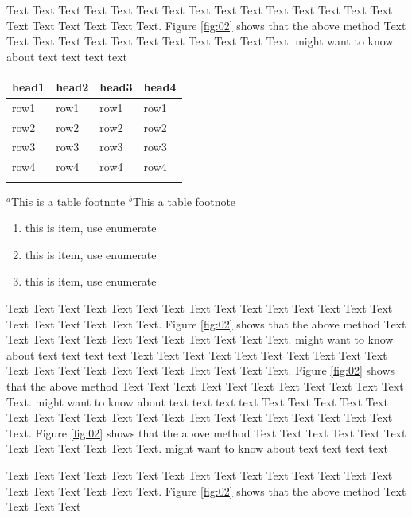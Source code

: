\documentclass{Rpd}
\begin{document}
Text Text Text Text Text Text  Text Text Text Text Text Text Text Text Text  Text Text Text Text Text Text. Figure \ref{fig:02} shows that the above method  Text Text Text Text  Text Text Text Text Text Text  Text Text.  \cite{Boffelli03} might want to know about  text text text text


\begin{table}[t]
{\begin{tabular}{llll}\toprule
head1 & head2 & head3 & head4\\\midrule
row1 & row1 & row1 & row1\\
row2 & row2 & row2 & row2\\
row3 & row3 & row3 & row3\\
row4 & row4 & row4 & row4\\\botrule
\end{tabular}}{$^a$This is a table footnote\newline
$^b$This a table footnote}
\end{table}

\begin{enumerate}[2.]%
\item this is item, use enumerate 
\item this is item, use enumerate 
\item this is item, use enumerate 
\end{enumerate}

Text Text Text Text Text Text  Text Text Text Text Text Text Text Text Text  Text Text Text Text Text Text. Figure \ref{fig:02} shows that the above method  Text Text Text Text  Text Text Text Text Text Text  Text Text.  \cite{Boffelli03} might want to know about  text text text text
Text Text Text Text Text Text  Text Text Text Text Text Text Text Text Text  Text Text Text Text Text Text. Figure \ref{fig:02} shows that the above method  Text Text Text Text  Text Text Text Text Text Text  Text Text.  \cite{Boffelli03} might want to know about  text text text text
Text Text Text Text Text Text  Text Text Text Text Text Text Text Text Text  Text Text Text Text Text Text. Figure \ref{fig:02} shows that the above method  Text Text Text Text  Text Text Text Text Text Text  Text Text.  \cite{Boffelli03} might want to know about  text text text text

Text Text Text Text Text Text  Text Text Text Text Text Text Text Text Text  Text Text Text Text Text Text. Figure \ref{fig:02} shows that the above method  Text Text Text Text  
\end{document}
